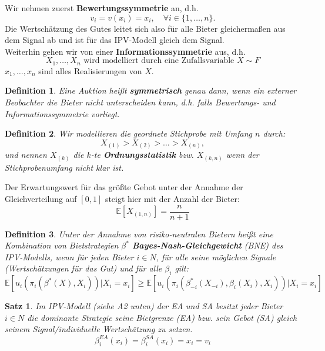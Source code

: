 \documentclass[12pt]{extreport} %
\theoremstyle{named}
\theoremstyle{nnamed}
\theoremstyle{itshape}
\newtheorem{satz}[unnamedtheorem]{Satz}
\newtheorem*{definition}{Definition}
\theoremstyle{normal}
\begin{document}
	Wir nehmen zuerst \textbf{Bewertungssymmetrie} an, d.h.
	$$ v_{i} = v(x_{i}) = x_{i}, \quad \forall i \in \{1, \dotsc, n\}. $$
	Die Wertschätzung des Gutes leitet sich also für alle Bieter gleichermaßen aus dem Signal ab und ist für das IPV-Modell gleich dem Signal. \\
	
	Weiterhin gehen wir von einer \textbf{Informationssymmetrie} aus, d.h.
	$$ X_{1}, \dotsc, X_{n} \text{ wird modelliert durch eine Zufallsvariable } X \sim F $$
	$x_{1}, \dotsc, x_{n}$ sind alles Realisierungen von $X$.

 
\begin{definition}
	Eine Auktion heißt \textbf{symmetrisch} genau dann, wenn ein externer Beobachter die Bieter nicht unterscheiden kann, d.h. falls Bewertungs- und Informationssymmetrie vorliegt.
\end{definition}

\begin{definition}
	Wir modellieren die geordnete Stichprobe mit Umfang $n$ durch:
		$$ X_{(1)} > X_{(2)} > \dotsc > X_{(n)}, $$
		und nennen $X_{(k)}$ die $k$-te \textbf{Ordnungsstatistik} bzw. $X_{(k, n)}$ wenn der Stichprobenumfang nicht klar ist.
\end{definition}

Der Erwartungswert für das größte Gebot unter der Annahme der Gleichverteilung auf $[0, 1]$ steigt hier mit der Anzahl der Bieter:
	$$ \mathbb{E}[X_{(1,n)}] = \frac{n}{n+1} $$

\begin{definition}
	Unter der Annahme von risiko-neutralen Bietern heißt eine Kombination von Bietstrategien $\beta^{*}$ \textbf{Bayes-Nash-Gleichgewicht} (BNE) des IPV-Modells, wenn für jeden Bieter $i \in N$, für alle seine möglichen Signale (Wertschätzungen für das Gut) und für alle $\beta_{i}$ gilt:
	$$ \mathbb{E}\left[u_{i}\left(\pi_{i}\left(\beta^{*}(X), X_{i}\right) \right) \big| X_{i} = x_{i}\right] \geq \mathbb{E}\left[u_{i}\left(\pi_{i}\left(\beta_{-i}^{*}(X_{-i}), \beta_{i}(X_{i}), X_{i}\right) \right) \big| X_{i} = x_{i}\right] $$
\end{definition}


\begin{satz}
	Im IPV-Modell (siehe A2 unten) der EA und SA besitzt jeder Bieter $i \in N$ die dominante Strategie seine Bietgrenze (EA) bzw. sein Gebot (SA) gleich seinem Signal/individuelle Wertschätzung zu setzen.
	$$ \beta_{i}^{EA}(x_{i}) = \beta_{i}^{SA}(x_{i}) = x_{i} = v_{i} $$
\end{satz}
\end{document}
